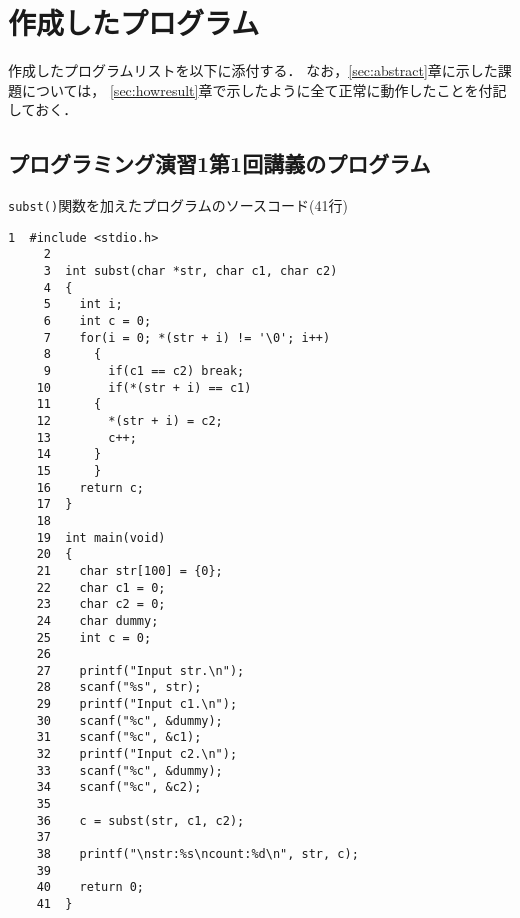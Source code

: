 \section{作成したプログラム}\label{sec:makep}

作成したプログラムリストを以下に添付する．
なお，\ref{sec:abstract}章に示した課題については，
\ref{sec:howresult}章で示したように全て正常に動作したことを付記しておく．


\subsection{プログラミング演習1第1回講義のプログラム}\label{func1}
\verb|subst()|関数を加えたプログラムのソースコード(41行)
\begin{Verbatim}[fontsize=\small, baselinestretch=0.8]
     1	#include <stdio.h>
     2	
     3	int subst(char *str, char c1, char c2)
     4	{
     5	  int i;
     6	  int c = 0;
     7	  for(i = 0; *(str + i) != '\0'; i++)
     8	    {
     9	      if(c1 == c2) break;
    10	      if(*(str + i) == c1)
    11		{
    12		  *(str + i) = c2;
    13		  c++;
    14		}
    15	    }
    16	  return c;
    17	}
    18	
    19	int main(void)
    20	{
    21	  char str[100] = {0};
    22	  char c1 = 0;
    23	  char c2 = 0;
    24	  char dummy;
    25	  int c = 0; 
    26	
    27	  printf("Input str.\n");
    28	  scanf("%s", str);
    29	  printf("Input c1.\n");
    30	  scanf("%c", &dummy);
    31	  scanf("%c", &c1);
    32	  printf("Input c2.\n");
    33	  scanf("%c", &dummy);
    34	  scanf("%c", &c2);
    35	
    36	  c = subst(str, c1, c2);
    37	  
    38	  printf("\nstr:%s\ncount:%d\n", str, c);
    39	
    40	  return 0;
    41	}
\end{Verbatim}

